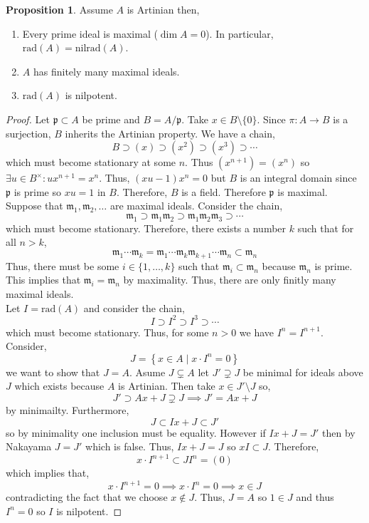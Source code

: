 \documentclass[12pt]{article}
\newcommand{\rad}[1]{\mathrm{rad}\left( #1 \right)}
\newcommand{\nilrad}[1]{\mathrm{nilrad}\left( #1 \right)}
\newcommand{\p}{\mathfrak{p}}
\newcommand{\m}{\mathfrak{m}}
\theoremstyle{remark}
\theoremstyle{definition}
\newtheorem{proposition}[theorem]{Proposition}
\begin{document}
\begin{proposition}
Assume $A$ is Artinian then,
\begin{enumerate}
\item Every prime ideal is maximal ($\dim{A} = 0$). In particular, $\rad{A} = \nilrad{A}$. 

\item $A$ has finitely many maximal ideals.

\item $\rad{A}$ is nilpotent. 
\end{enumerate}
\end{proposition}

\begin{proof}
Let $\p \subset A$ be prime and $B = A / \p$. Take $x \in B \setminus \{0\}$. Since $\pi : A \to B$ is a surjection, $B$ inherits the Artinian property. We have a chain,
\[ B \supset (x) \supset (x^2) \supset (x^3) \supset \cdots\]
which must become stationary at some $n$. Thus $(x^{n+1}) = (x^n)$ so $\exists u \in B^\times : u x^{n+1} = x^n$. Thus, $(x u - 1) x^n = 0$ but $B$ is an integral domain since $\p$ is prime so $xu = 1$ in $B$. Therefore, $B$ is a field. Therefore $\p$ is maximal.
\bigskip\\
Suppose that $\m_1, \m_2, \dots$ are maximal ideals. Consider the chain,
\[ \m_1 \supset \m_1 \m_2 \supset \m_1 \m_2 \m_3 \supset \cdots \]
which must become stationary. Therefore, there exists a number $k$ such that for all $n > k$,
\[\m_1 \cdots \m_k = \m_1 \cdots \m_k \m_{k+1} \cdots \m_{n} \subset \m_{n}\]
Thus, there must be some $i \in \{ 1, \dots, k \}$ such that  $\m_i \subset \m_{n}$ because $\m_{n}$ is prime. This implies that $\m_i= \m_{n}$ by maximality. Thus, there are only finitly many maximal ideals.
\bigskip\\
Let $I = \rad{A}$ and consider the chain,
\[ I \supset I^2 \supset I^3 \supset \cdots \]
which must become stationary. Thus, for some $n > 0$ we have $I^n = I^{n+1}$. Consider,
\[ J = \left\{ x \in A \mid x \cdot I^n = 0 \right\} \]
we want to show that $J = A$. Asume $J \subsetneq A$ let $J' \supsetneq J$ be minimal for ideals above $J$ which exists because $A$ is Artinian. Then take $x \in J' \setminus J$ so,
\[ J' \supset Ax + J \supsetneq J \implies J' = Ax + J \] 
by minimailty. Furthermore,
\[ J \subset Ix + J \subset J' \]
so by minimality one inclusion must be equality. However if $Ix + J = J'$ then by Nakayama $J = J'$ which is false. Thus, $Ix + J = J$ so $x I \subset J$. Therefore, 
\[ x \cdot I^{n+1} \subset J I^n = (0) \]
which implies that,
\[ x \cdot I^{n+1} = 0 \implies x \cdot I^n = 0 \implies x \in J \]
contradicting the fact that we choose $x \notin J$. Thus, $J = A$ so $1 \in J$ and thus $I^n = 0$ so $I$ is nilpotent. 
\end{proof}
\end{document}
